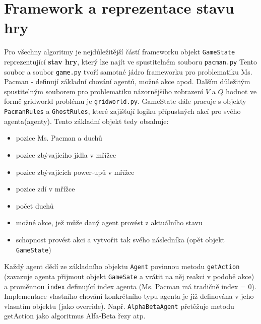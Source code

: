 \section{Framework a reprezentace stavu hry}
Pro všechny algoritmy je nejdůležitější částí frameworku objekt \texttt{GameState} reprezentující \textbf{stav hry}, který lze najít ve spustitelném souboru \texttt{pacman.py} Tento soubor a soubor \texttt{game.py} tvoří samotné jádro frameworku pro problematiku Ms. Pacman - definují základní chování agentů, možné akce apod.
Dalším důležitým spustitelným souborem pro problematiku názornějšího zobrazení $V$ a $Q$ hodnot ve formě gridworld problému je \texttt{gridworld.py}.
GameState dále pracuje s objekty \texttt{PacmanRules} a \texttt{GhostRules}, které zajišťují logiku přípustných akcí pro svého agenta(agenty).
Tento základní objekt tedy obsahuje:
\begin{itemize}
\item pozice Ms. Pacman a duchů
\item pozice zbývajícího jídla v mřížce
\item pozice zbývajících power-upů v mřížce
\item pozice zdí v mřížce
\item počet duchů
\item možné akce, jež může daný agent provést z aktuálního stavu
\item schopnost provést akci a vytvořit tak svého následníka (opět objekt \texttt{GameState})
\end{itemize}
Každý agent dědí ze základního objektu \texttt{Agent} povinnou metodu \texttt{getAction} (zavazuje agenta přijmout objekt \texttt{GameSate} a vrátit na něj reakci v podobě akce) a proměnnou \texttt{index} definující index agenta (Ms. Pacman má tradičně index = 0).
Implementace vlastního chování konkrétního typu agenta je již definována v jeho vlasntím objektu (jako override). Např. \texttt{AlphaBetaAgent} přetěžuje metodu getAction jako algoritmus Alfa-Beta řezy atp.

